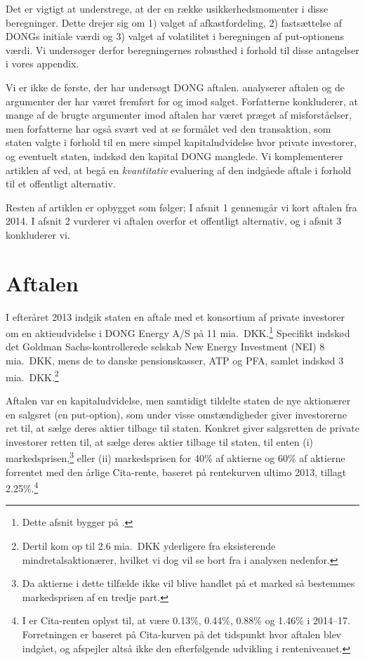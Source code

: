 \documentclass{article}
\begin{document}
Det er vigtigt at understrege, at der en række usikkerhedsmomenter i disse beregninger. Dette drejer sig om 1) valget af afkastfordeling, 2) fastsættelse af DONGs initiale værdi og 3) valget af volatilitet i beregningen af put-optionens værdi. Vi undersøger derfor beregningernes robusthed i forhold til disse antagelser i vores appendix.

Vi er ikke de første, der har undersøgt DONG aftalen. \cite{Bachman2014} analyserer aftalen og de argumenter der har været fremført for og imod salget. Forfatterne konkluderer, at mange af de brugte argumenter imod aftalen har været præget af misforståelser, men forfatterne har også svært ved at se formålet ved den transaktion, som staten valgte i forhold til en mere simpel kapitaludvidelse hvor private investorer, og eventuelt staten, indskød den kapital DONG manglede. Vi komplementerer artiklen af \cite{Bachman2014} ved, at begå en \emph{kvantitativ} evaluering af den indgåede aftale i forhold til et offentligt alternativ. 

Resten af artiklen er opbygget som følger; I afsnit 1 gennemgår vi kort aftalen fra 2014. I afsnit 2 vurderer vi aftalen overfor et offentligt alternativ, og i afsnit 3 konkluderer vi.


\section{Aftalen}
I efteråret 2013 indgik staten en aftale med et konsortium af private investorer om en aktieudvidelse i DONG Energy A/S på 11 mia.\ DKK.\footnote{Dette afsnit bygger på \citet{FM2013a}.} Specifikt indskød det Goldman Sachs-kontrollerede selskab New Energy Investment (NEI) 8 mia.\ DKK, mens de to danske pensionskasser, ATP og PFA, samlet indskød 3 mia.\ DKK.\footnote{Dertil kom op til 2.6 mia.\ DKK yderligere fra eksisterende mindretalsaktionærer, hvilket vi dog vil se bort fra i analysen nedenfor.}

Aftalen var en kapitaludvidelse, men samtidigt tildelte staten de nye aktionærer en salgsret (en put-option), som under visse omstændigheder giver investorerne ret til, at sælge deres aktier tilbage til staten. Konkret giver salgsretten de private investorer retten til, at sælge deres aktier tilbage til staten,  til enten (i) markedsprisen,\footnote{Da aktierne i dette tilfælde ikke vil blive handlet på et marked så bestemmes markedsprisen af en tredje part.} eller (ii) markedsprisen for 40\% af aktierne og 60\% af aktierne forrentet med den årlige Cita-rente, baseret på rentekurven ultimo 2013, tillagt 2.25\%.\footnote{I \citet{FM2013f} er Cita-renten oplyst til, at være 0.13\%, 0.44\%, 0.88\% og 1.46\% i 2014--17. Forretningen er baseret på Cita-kurven på det tidspunkt hvor aftalen blev indgået, og afspejler altså ikke den efterfølgende udvikling i renteniveauet.}
\end{document}
